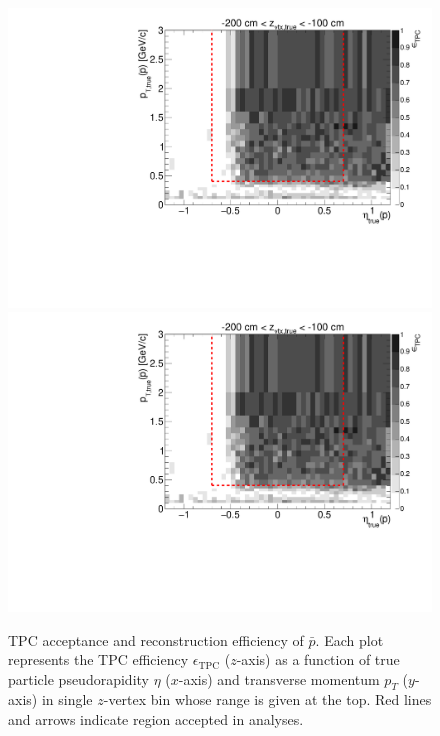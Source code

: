 \begin{figure}[hb]
\caption[TPC acceptance and reconstruction efficiency of $\bar{p}$.]{TPC acceptance and reconstruction efficiency of $\bar{p}$. Each plot represents the TPC efficiency $\epsilon_{\text{TPC}}$ ($z$-axis) as a function of true particle pseudorapidity $\eta$ ($x$-axis) and transverse momentum $p_{T}$ ($y$-axis) in single $z$-vertex bin whose range is given at the top. Red lines and arrows indicate region accepted in analyses.}\label{fig:tpcEff_proton_minus}
\centering
\parbox{0.495\textwidth}{
  \centering
  \includegraphics[width=\linewidth,page=3]{graphics/eff/Eff2D_TPC_proton_Minus.pdf}\\
  \includegraphics[width=\linewidth,page=5]{graphics/eff/Eff2D_TPC_proton_Minus.pdf}\\
}
\end{figure}
